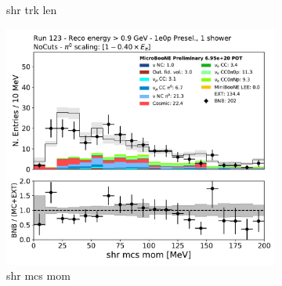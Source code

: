 \begin{figure}[H]
\begin{subfigure}{0.3\textwidth}
    \caption{shr trk len}
    \end{subfigure}
    \begin{subfigure}{0.3\textwidth}
    \includegraphics[width=1.0\textwidth]{1e0p/High_E_Sideband/shrMCSMom.pdf}
    \caption{shr mcs mom}
    \end{subfigure}
    \caption{} 
    \label{fig:HE_1eNp_1}
\end{figure}

